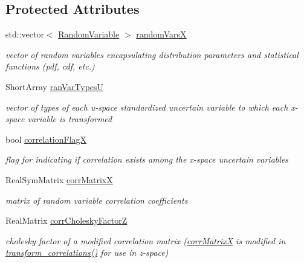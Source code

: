 \subsection*{Protected Attributes}
\begin{DoxyCompactItemize}
\item 
std\+::vector$<$ \hyperlink{classPecos_1_1RandomVariable}{Random\+Variable} $>$ \hyperlink{classPecos_1_1ProbabilityTransformation_a4da973578906b511c40032bc4a672386}{random\+VarsX}\label{classPecos_1_1ProbabilityTransformation_a4da973578906b511c40032bc4a672386}

\begin{DoxyCompactList}\small\item\em vector of random variables encapsulating distribution parameters and statistical functions (pdf, cdf, etc.) \end{DoxyCompactList}\item 
Short\+Array \hyperlink{classPecos_1_1ProbabilityTransformation_af9b0973be8faa921e910bcdf21babbb3}{ran\+Var\+TypesU}\label{classPecos_1_1ProbabilityTransformation_af9b0973be8faa921e910bcdf21babbb3}

\begin{DoxyCompactList}\small\item\em vector of types of each u-\/space standardized uncertain variable to which each x-\/space variable is transformed \end{DoxyCompactList}\item 
bool \hyperlink{classPecos_1_1ProbabilityTransformation_a573ad066536879931a13ab61f904558a}{correlation\+FlagX}\label{classPecos_1_1ProbabilityTransformation_a573ad066536879931a13ab61f904558a}

\begin{DoxyCompactList}\small\item\em flag for indicating if correlation exists among the x-\/space uncertain variables \end{DoxyCompactList}\item 
Real\+Sym\+Matrix \hyperlink{classPecos_1_1ProbabilityTransformation_ab7abacb49841afb07bc534a84db77a90}{corr\+MatrixX}\label{classPecos_1_1ProbabilityTransformation_ab7abacb49841afb07bc534a84db77a90}

\begin{DoxyCompactList}\small\item\em matrix of random variable correlation coefficients \end{DoxyCompactList}\item 
Real\+Matrix \hyperlink{classPecos_1_1ProbabilityTransformation_a716bdf5cc30737f0df0c37b98a826f41}{corr\+Cholesky\+FactorZ}\label{classPecos_1_1ProbabilityTransformation_a716bdf5cc30737f0df0c37b98a826f41}

\begin{DoxyCompactList}\small\item\em cholesky factor of a modified correlation matrix (\hyperlink{classPecos_1_1ProbabilityTransformation_ab7abacb49841afb07bc534a84db77a90}{corr\+MatrixX} is modified in \hyperlink{classPecos_1_1ProbabilityTransformation_a1be77b7133acb8e63d2c6957b9eb6265}{transform\+\_\+correlations()} for use in z-\/space) \end{DoxyCompactList}\end{DoxyCompactItemize}

